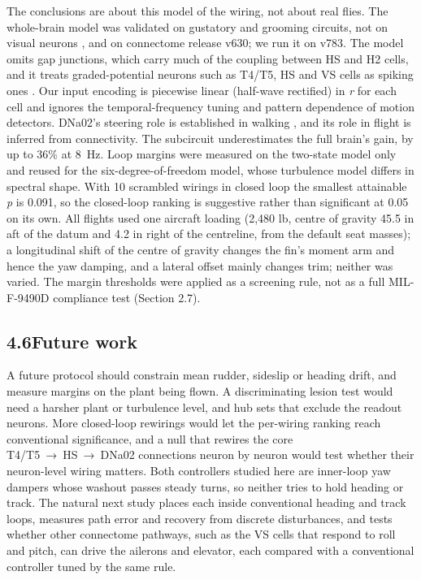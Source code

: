\documentclass[11pt,letterpaper]{article}
\begin{document}
\noindent The conclusions are about this model of the wiring, not about
real flies. The whole-brain model was validated on gustatory and
grooming circuits, not on visual neurons \cite{shiu2024}, and on
connectome release v630; we run it on v783. The model omits gap
junctions, which carry much of the coupling between HS and H2 cells, and
it treats graded-potential neurons such as T4/T5, HS and VS cells as
spiking ones \cite{shiu2024,pokusaeva2024}. Our input encoding is
piecewise linear (half-wave rectified) in \emph{r} for each cell and
ignores the temporal-frequency tuning and pattern dependence of motion
detectors. DNa02's steering role is established in walking
\cite{rayshubskiy2025}, and its role in flight is inferred from
connectivity. The subcircuit underestimates the full brain's gain, by up
to 36\% at 8~Hz. Loop margins were measured on the two-state model only
and reused for the six-degree-of-freedom model, whose turbulence model
differs in spectral shape. With 10 scrambled wirings in closed loop the
smallest attainable \emph{p} is 0.091, so the closed-loop ranking is
suggestive rather than significant at 0.05 on its own. All flights used
one aircraft loading (2,480 lb, centre of gravity 45.5 in aft of the
datum and 4.2 in right of the centreline, from the default seat masses);
a longitudinal shift of the centre of gravity changes the fin's moment
arm and hence the yaw damping, and a lateral offset mainly changes trim;
neither was varied. The margin thresholds were applied as a screening
rule, not as a full MIL-F-9490D compliance test (Section 2.7).

\subsection{\texorpdfstring{4.6\quad Future
work}{4.6Future work}}\label{future-work}

\noindent A future protocol should constrain mean rudder, sideslip or
heading drift, and measure margins on the plant being flown. A
discriminating lesion test would need a harsher plant or turbulence
level, and hub sets that exclude the readout neurons. More closed-loop
rewirings would let the per-wiring ranking reach conventional
significance, and a null that rewires the core T4/T5~→~HS~→~DNa02
connections neuron by neuron would test whether their neuron-level
wiring matters. Both controllers studied here are inner-loop yaw dampers
whose washout passes steady turns, so neither tries to hold heading or
track. The natural next study places each inside conventional heading
and track loops, measures path error and recovery from discrete
disturbances, and tests whether other connectome pathways, such as the
VS cells that respond to roll and pitch, can drive the ailerons and
elevator, each compared with a conventional controller tuned by the same
rule.
\end{document}
